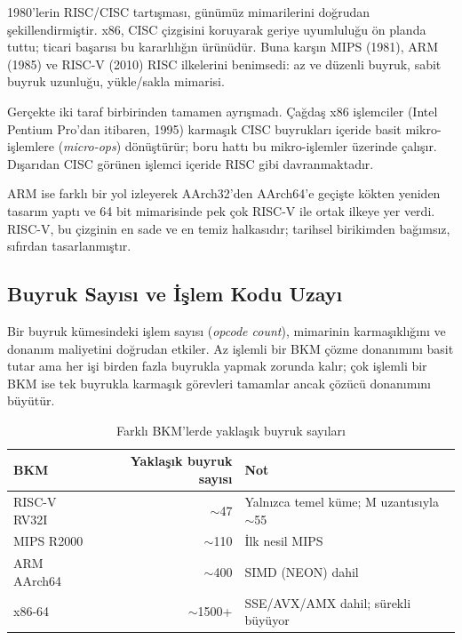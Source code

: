 \begin{karsilastirma}
1980'lerin RISC/CISC tartışması, günümüz mimarilerini doğrudan şekillendirmiştir. x86, CISC çizgisini koruyarak geriye uyumluluğu ön planda tuttu; ticari başarısı bu kararlılığın ürünüdür. Buna karşın MIPS (1981), ARM (1985) ve RISC-V (2010) RISC ilkelerini benimsedi: az ve düzenli buyruk, sabit buyruk uzunluğu, yükle/sakla mimarisi.

Gerçekte iki taraf birbirinden tamamen ayrışmadı. Çağdaş x86 işlemciler (Intel Pentium Pro'dan itibaren, 1995) karmaşık CISC buyrukları içeride basit mikro-işlemlere (\emph{micro-ops}) dönüştürür; boru hattı bu mikro-işlemler üzerinde çalışır. Dışarıdan CISC görünen işlemci içeride RISC gibi davranmaktadır.

ARM ise farklı bir yol izleyerek AArch32'den AArch64'e geçişte kökten yeniden tasarım yaptı ve 64 bit mimarisinde pek çok RISC-V ile ortak ilkeye yer verdi. RISC-V, bu çizginin en sade ve en temiz halkasıdır; tarihsel birikimden bağımsız, sıfırdan tasarlanmıştır.
\end{karsilastirma}

\subsection{Buyruk Sayısı ve İşlem Kodu Uzayı}
\label{sec:buyruk-sayisi}

Bir buyruk kümesindeki işlem sayısı (\emph{opcode count}), mimarinin karmaşıklığını ve donanım maliyetini doğrudan etkiler. Az işlemli bir BKM çözme donanımını basit tutar ama her işi birden fazla buyrukla yapmak zorunda kalır; çok işlemli bir BKM ise tek buyrukla karmaşık görevleri tamamlar ancak çözücü donanımını büyütür.

\begin{table}[H]
\centering
\caption{Farklı BKM'lerde yaklaşık buyruk sayıları}
\label{tab:buyruk-sayilari}
\footnotesize
\begin{tabular}{lrl}
\toprule
\textbf{BKM} & \textbf{Yaklaşık buyruk sayısı} & \textbf{Not} \\
\midrule
RISC-V RV32I  & $\sim$47   & Yalnızca temel küme; M uzantısıyla $\sim$55 \\
MIPS R2000    & $\sim$110  & İlk nesil MIPS \\
ARM AArch64   & $\sim$400  & SIMD (NEON) dahil \\
x86-64        & $\sim$1500+  & SSE/AVX/AMX dahil; sürekli büyüyor \\
\bottomrule
\end{tabular}
\end{table}

